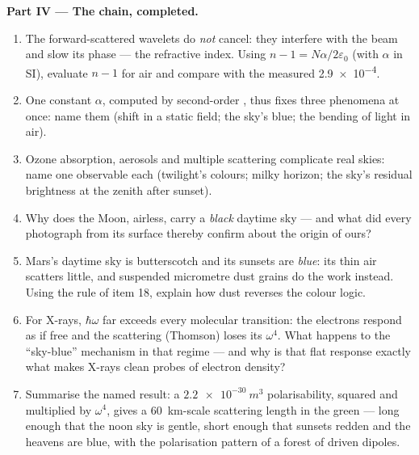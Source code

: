 \begin{problem}
\medskip\noindent\textbf{Part IV --- The chain, completed.}
\begin{enumerate}[resume]
  \item The forward-scattered wavelets do \emph{not} cancel: they
        interfere with the beam and slow its phase --- the
        refractive index. Using $n - 1 = N\alpha/2\varepsilon_0$
        (with $\alpha$ in SI), evaluate $n - 1$ for air and
        compare with the measured \num{2.9e-4}.
  \item One constant $\alpha$, computed by second-order
        , thus fixes three phenomena at once:
        name them (shift in a static field; the sky's blue; the
        bending of light in air).
  \item Ozone absorption, aerosols and multiple scattering
        complicate real skies: name one observable each
        (twilight's colours; milky horizon; the sky's residual
        brightness at the zenith after sunset).
  \item Why does the Moon, airless, carry a \emph{black} daytime
        sky --- and what did every photograph from its surface
        thereby confirm about the origin of ours?
  \item Mars's daytime sky is butterscotch and its sunsets are
        \emph{blue}: its thin air scatters little, and suspended
        micrometre dust grains do the work instead. Using the rule
        of item 18, explain how dust reverses the colour logic.
  \item For X-rays, $\hbar\omega$ far exceeds every molecular
        transition: the electrons respond as if free and the
        scattering (Thomson) loses its $\omega^4$. What happens to
        the ``sky-blue'' mechanism in that regime --- and why is
        that flat response exactly what makes X-rays clean probes
        of electron density?
  \item Summarise the named result: a $\qty{2.2e-30}{m^3}$
        polarisability, squared and multiplied by $\omega^4$,
        gives a \qty{60}{km}-scale scattering length in the green
        --- long enough that the noon sky is gentle, short enough
        that sunsets redden and the heavens are blue, with the
        polarisation pattern of a forest of driven dipoles.
\end{enumerate}
\end{problem}
